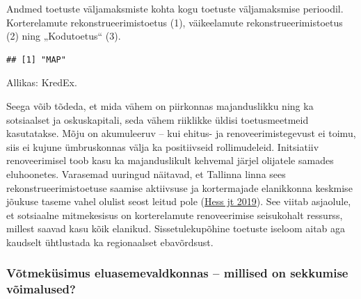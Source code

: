 \documentclass[estonian,]{article}
\begin{document}
Andmed toetuste väljamaksmiste kohta kogu toetuste väljamaksmise perioodil. Korterelamute rekonstrueerimistoetus (1), väikeelamute rekonstrueerimistoetus (2) ning „Kodutoetus`` (3).

\begin{verbatim}
## [1] "MAP"
\end{verbatim}

\begin{imgsource}
{Allikas:} KredEx.
\end{imgsource}

Seega võib tõdeda, et mida vähem on piirkonnas majanduslikku ning ka sotsiaalset ja oskuskapitali, seda vähem riiklikke üldisi toetusmeetmeid kasutatakse. Mõju on akumuleeruv -- kui ehitus- ja renoveerimistegevust ei toimu, siis ei kujune ümbruskonnas välja ka positiivseid rollimudeleid. Initsiatiiv renoveerimisel toob kasu ka majanduslikult kehvemal järjel olijatele samades eluhoonetes. Varasemad uuringud näitavad, et Tallinna linna sees rekonstrueerimistoetuse saamise aktiivsuse ja kortermajade elanikkonna keskmise jõukuse taseme vahel olulist seost leitud pole (\protect\hyperlink{Hess2019}{Hess jt 2019}). See viitab asjaolule, et sotsiaalne mitmekesisus on korterelamute renoveerimise seisukohalt ressurss, millest saavad kasu kõik elanikud. Sissetulekupõhine toetuste iseloom aitab aga kaudselt ühtlustada ka regionaalset ebavõrdsust.

\hypertarget{vuxf5tmekuxfcsimus-eluasemevaldkonnas-millised-on-sekkumise-vuxf5imalused}{%
\subsubsection*{Võtmeküsimus eluasemevaldkonnas -- millised on sekkumise võimalused?}\label{vuxf5tmekuxfcsimus-eluasemevaldkonnas-millised-on-sekkumise-vuxf5imalused}}
\end{document}
